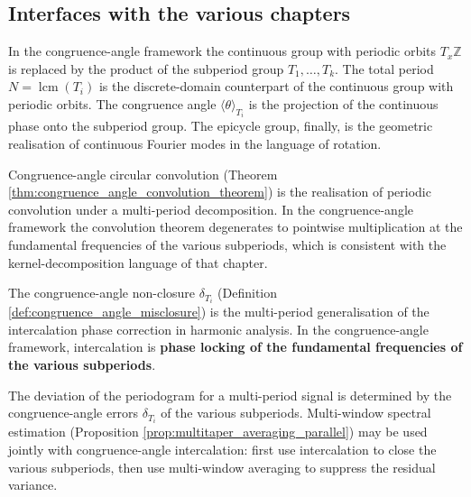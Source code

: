 \subsection{Interfaces with the various chapters}

\begin{remark}\label{rem:interface_group_with_periodic_orbits_congruence}
In the congruence-angle framework the continuous group with periodic orbits $T_x\mathbb{Z}$ is replaced by the product of the subperiod group $T_1,\dots,T_k$. The total period $N=\operatorname{lcm}(T_i)$ is the discrete-domain counterpart of the continuous group with periodic orbits. The congruence angle $\langle\theta\rangle_{T_i}$ is the projection of the continuous phase onto the subperiod group. The epicycle group, finally, is the geometric realisation of continuous Fourier modes in the language of rotation.
\end{remark}

\begin{remark}\label{rem:interface_series_convolution_congruence}
Congruence-angle circular convolution (Theorem \ref{thm:congruence_angle_convolution_theorem}) is the realisation of periodic convolution under a multi-period decomposition. In the congruence-angle framework the convolution theorem degenerates to pointwise multiplication at the fundamental frequencies of the various subperiods, which is consistent with the kernel-decomposition language of that chapter.
\end{remark}

\begin{remark}\label{rem:interface_harmonic_congruence}
The congruence-angle non-closure $\delta_{T_i}$ (Definition \ref{def:congruence_angle_misclosure}) is the multi-period generalisation of the intercalation phase correction in harmonic analysis. In the congruence-angle framework, intercalation is \textbf{phase locking of the fundamental frequencies of the various subperiods}.
\end{remark}

\begin{remark}\label{rem:interface_time_series_congruence}
The deviation of the periodogram for a multi-period signal is determined by the congruence-angle errors $\delta_{T_i}$ of the various subperiods. Multi-window spectral estimation (Proposition \ref{prop:multitaper_averaging_parallel}) may be used jointly with congruence-angle intercalation: first use intercalation to close the various subperiods, then use multi-window averaging to suppress the residual variance.
\end{remark}

